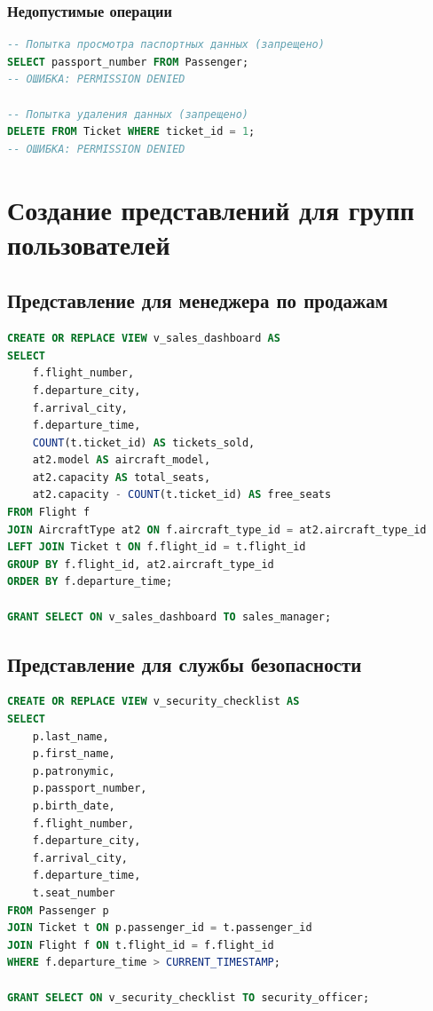 \documentclass[a4paper,12pt]{article}
\begin{document}
\subsubsection*{Недопустимые операции}

\begin{lstlisting}[language=SQL]
-- Попытка просмотра паспортных данных (запрещено)
SELECT passport_number FROM Passenger;
-- ОШИБКА: PERMISSION DENIED

-- Попытка удаления данных (запрещено)
DELETE FROM Ticket WHERE ticket_id = 1;
-- ОШИБКА: PERMISSION DENIED
\end{lstlisting}

\section{Создание представлений для групп пользователей}

\subsection{Представление для менеджера по продажам}

\begin{lstlisting}[language=SQL, caption=Дашборд продаж]
CREATE OR REPLACE VIEW v_sales_dashboard AS
SELECT 
    f.flight_number,
    f.departure_city,
    f.arrival_city,
    f.departure_time,
    COUNT(t.ticket_id) AS tickets_sold,
    at2.model AS aircraft_model,
    at2.capacity AS total_seats,
    at2.capacity - COUNT(t.ticket_id) AS free_seats
FROM Flight f
JOIN AircraftType at2 ON f.aircraft_type_id = at2.aircraft_type_id
LEFT JOIN Ticket t ON f.flight_id = t.flight_id
GROUP BY f.flight_id, at2.aircraft_type_id
ORDER BY f.departure_time;

GRANT SELECT ON v_sales_dashboard TO sales_manager;
\end{lstlisting}

\subsection{Представление для службы безопасности}

\begin{lstlisting}[language=SQL, caption=Контрольный список пассажиров]
CREATE OR REPLACE VIEW v_security_checklist AS
SELECT 
    p.last_name,
    p.first_name,
    p.patronymic,
    p.passport_number,
    p.birth_date,
    f.flight_number,
    f.departure_city,
    f.arrival_city,
    f.departure_time,
    t.seat_number
FROM Passenger p
JOIN Ticket t ON p.passenger_id = t.passenger_id
JOIN Flight f ON t.flight_id = f.flight_id
WHERE f.departure_time > CURRENT_TIMESTAMP;

GRANT SELECT ON v_security_checklist TO security_officer;
\end{lstlisting}
\end{document}

